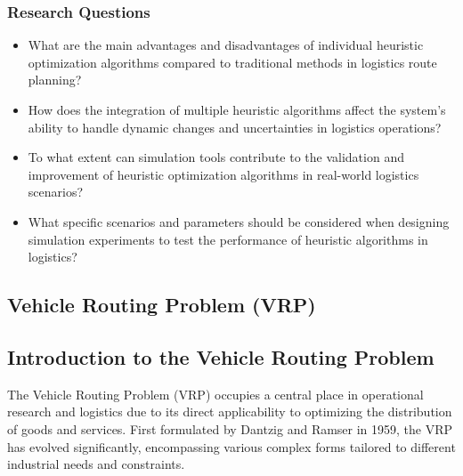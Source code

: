 \documentclass[
]{article}
\begin{document}
\subsubsection{Research Questions}
\begin{itemize}
    \item What are the main advantages and disadvantages of individual heuristic optimization algorithms compared to traditional methods in logistics route planning?
    \item How does the integration of multiple heuristic algorithms affect the system's ability to handle dynamic changes and uncertainties in logistics operations?
    \item To what extent can simulation tools contribute to the validation and improvement of heuristic optimization algorithms in real-world logistics scenarios?
    \item What specific scenarios and parameters should be considered when designing simulation experiments to test the performance of heuristic algorithms in logistics?
\end{itemize}


\newpage




\hypertarget{vehicle-routing-problem}{%
  \subsection{Vehicle Routing Problem (VRP)}\label{vehicle-routing-problem}}


\hypertarget{introduction-to-the-vehicle-routing-problem}{%
  \subsection{Introduction to the Vehicle Routing Problem}\label{introduction-to-the-vehicle-routing-problem}}

The Vehicle Routing Problem (VRP) occupies a central place in operational research and logistics due to its direct applicability to optimizing the distribution of goods and services. First formulated by Dantzig and Ramser in 1959, the VRP has evolved significantly, encompassing various complex forms tailored to different industrial needs and constraints.
\end{document}
